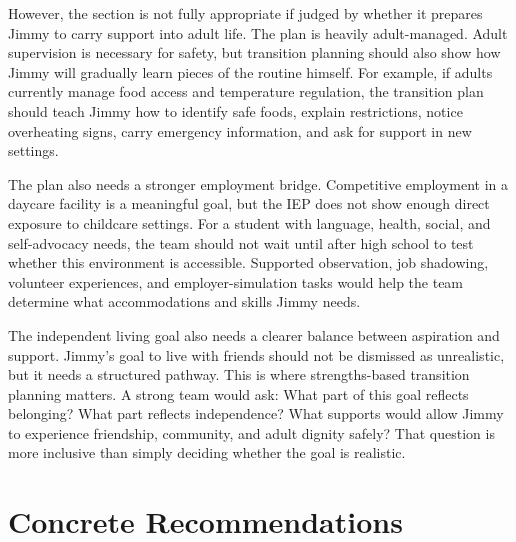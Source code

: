 \documentclass[11pt]{article}
\begin{document}
However, the section is not fully appropriate if judged by whether it prepares Jimmy to carry support into adult life. The plan is heavily adult-managed. Adult supervision is necessary for safety, but transition planning should also show how Jimmy will gradually learn pieces of the routine himself. For example, if adults currently manage food access and temperature regulation, the transition plan should teach Jimmy how to identify safe foods, explain restrictions, notice overheating signs, carry emergency information, and ask for support in new settings.

The plan also needs a stronger employment bridge. Competitive employment in a daycare facility is a meaningful goal, but the IEP does not show enough direct exposure to childcare settings. For a student with language, health, social, and self-advocacy needs, the team should not wait until after high school to test whether this environment is accessible. Supported observation, job shadowing, volunteer experiences, and employer-simulation tasks would help the team determine what accommodations and skills Jimmy needs.

The independent living goal also needs a clearer balance between aspiration and support. Jimmy's goal to live with friends should not be dismissed as unrealistic, but it needs a structured pathway. This is where strengths-based transition planning matters. A strong team would ask: What part of this goal reflects belonging? What part reflects independence? What supports would allow Jimmy to experience friendship, community, and adult dignity safely? That question is more inclusive than simply deciding whether the goal is realistic.

\section{Concrete Recommendations}
\end{document}
